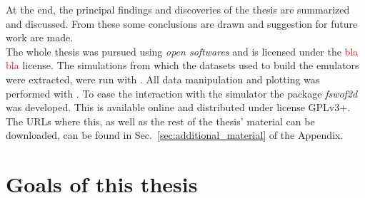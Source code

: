 At the end, the principal findings and discoveries of the thesis are summarized and discussed.
From these some conclusions are drawn and suggestion for future work are made.\\

The whole thesis was pursued using \emph{open softwares} and is licensed under the \textcolor{red}{bla bla}  license.
The simulations from which the datasets used to build the emulators were extracted, were run with .
All data manipulation and plotting was performed with .
To ease the interaction with the simulator the  package \emph{fswof2d} was developed.
This is available online and distributed under license GPLv3+.
The URLs where this, as well as the rest of the thesis' material can be downloaded, can be found in Sec.~\ref{sec:additional_material} of the Appendix.


\section{Goals of this thesis}


















